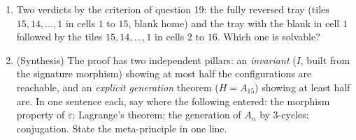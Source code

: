 \begin{problem}
\begin{enumerate}[resume]
{        $\operatorname{lcm}(n, n-1) = n(n-1)$)}, and that there
        are $(n - 2)!$ classes --- for $n \geq 5$ far more than
        $2$: on a thin board the parity invariant captures almost
        nothing, and geometry rules.
  \item Two verdicts by the criterion of question 19: the fully
        reversed tray (tiles $15, 14, \dots, 1$ in cells $1$
        to $15$, blank home) and the tray with the blank in cell
        $1$ followed by the tiles $15, 14, \dots, 1$ in cells $2$
        to $16$. Which one is solvable?
  \item (Synthesis) The proof has two independent pillars: an
        \emph{invariant} ($I$, built from the signature morphism)
        showing at most half the configurations are reachable, and
        an \emph{explicit generation} theorem ($H = A_{15}$)
        showing at least half are. In one sentence each, say where
        the following entered: the morphism property of
        $\varepsilon$; Lagrange's theorem; the generation of $A_n$
        by $3$-cycles; conjugation. State the meta-principle in
        one line.
\end{enumerate}
\end{problem}
